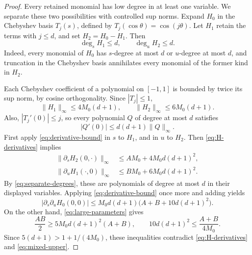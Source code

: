 \begin{proof}
Every retained monomial has low degree in at least one variable.
We separate these two possibilities with controlled sup norms.
Expand \(H_0\) in the Chebyshev basis \(T_j(s)\), defined by
\(T_j(\cos\theta)=\cos(j\theta)\). Let \(H_1\) retain the terms
with \(j\le d\), and set \(H_2=H_0-H_1\).
Then
\begin{equation}\label{eq:separate-degrees}
\deg_sH_1\le d,\qquad \deg_uH_2\le d.
\end{equation}
Indeed, every monomial of \(H_0\) has \(s\)-degree at most \(d\)
or \(u\)-degree at most \(d\), and truncation in the Chebyshev
basis annihilates every monomial of the former kind in \(H_2\).

Each Chebyshev coefficient of a polynomial on \([-1,1]\) is bounded
by twice its sup norm, by cosine orthogonality. Since \(|T_j|\le1\),
\[
\|H_1\|_\infty\le4M_0(d+1),\qquad
\|H_2\|_\infty\le6M_0(d+1).
\]
Also, \(|T_j'(0)|\le j\), so every polynomial \(Q\) of degree at most
\(d\) satisfies
\begin{equation}\label{eq:derivative-bound}
|Q'(0)|\le d(d+1)\|Q\|_\infty.
\end{equation}
First apply \eqref{eq:derivative-bound} in \(s\) to \(H_1\), and
in \(u\) to \(H_2\). Then \eqref{eq:H-derivatives} implies
\[
\begin{split}
\|\partial_sH_2(0,\cdot)\|_\infty
&\le AM_0+4M_0d(d+1)^2,\\
\|\partial_uH_1(\cdot,0)\|_\infty
&\le BM_0+6M_0d(d+1)^2.
\end{split}
\]
By \eqref{eq:separate-degrees}, these are polynomials of degree
at most \(d\) in their displayed variables. Applying
\eqref{eq:derivative-bound} once more and adding yields
\begin{equation}\label{eq:mixed-upper}
|\partial_s\partial_uH_0(0,0)|
\le M_0d(d+1)\bigl(A+B+10d(d+1)^2\bigr).
\end{equation}
On the other hand, \eqref{eq:large-parameters} gives
\[
\frac{AB}{2}\ge5M_0d(d+1)^2(A+B),\qquad
10d(d+1)^2\le\frac{A+B}{4M_0}.
\]
Since \(5(d+1)>1+1/(4M_0)\), these inequalities contradict
\eqref{eq:H-derivatives} and \eqref{eq:mixed-upper}.
\end{proof}
